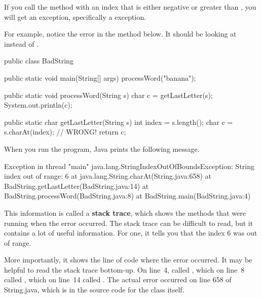 
If you call the  method with an index that is either negative or greater than , you will get an exception, specifically a  exception.

For example, notice the error in the  method below.
It should be looking at  instead of .

\begin{code}
public class BadString {
    public static void main(String[] args) {
        processWord("banana");
    }

    public static void processWord(String s) {
        char c = getLastLetter(s);
        System.out.println(c);
    }

    public static char getLastLetter(String s) {
        int index = s.length();
        char c = s.charAt(index);  // WRONG!
        return c;
    }
}
\end{code}

When you run the  program, Java prints the following message.

\begin{small}
\begin{stdout}
Exception in thread "main" java.lang.StringIndexOutOfBoundsException:
String index out of range: 6
    at java.lang.String.charAt(String.java:658)
    at BadString.getLastLetter(BadString.java:14)
    at BadString.processWord(BadString.java:8)
    at BadString.main(BadString.java:4)
\end{stdout}
\end{small}



This information is called a {\bf stack trace}, which shows the methods that were running when the error occurred.
The stack trace can be difficult to read, but it contains a lot of useful information.
For one, it tells you that the index 6 was out of range.

More importantly, it shows the line of code where the error occurred.
It may be helpful to read the stack trace bottom-up.
On line~4,  called , which on line~8 called , which on line~14 called .
The actual error occurred on line 658 of String.java, which is in the source code for the  class itself.

